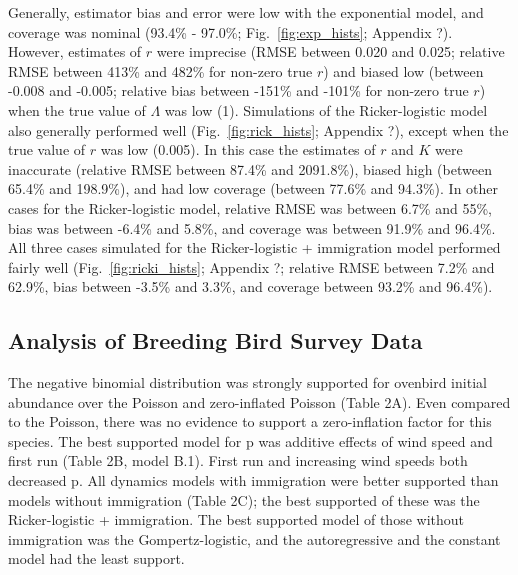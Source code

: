 \documentclass[12pt]{article}
\begin{document}
Generally, estimator bias and error were low with the exponential model, and 
coverage was nominal (93.4\% - 97.0\%; Fig.~\ref{fig:exp_hists}; Appendix ?). 
However, estimates of $r$ were 
imprecise (RMSE between 0.020 and 0.025; relative RMSE between 413\% and 
482\% for non-zero true $r$) and biased low (between -0.008 and -0.005; relative bias between
-151\% and -101\% for non-zero true $r$) when the true value of $\Lambda$ was low (1). 
Simulations of the Ricker-logistic model also generally performed well (Fig.~\ref{fig:rick_hists}; 
Appendix ?), except when the true value of $r$ was low (0.005). In this case the 
estimates of $r$ and $K$ were inaccurate (relative RMSE between 87.4\% and 2091.8\%),
biased high (between 65.4\% and 198.9\%), and had low coverage (between 77.6\% and 94.3\%).
In other cases for the Ricker-logistic model, relative RMSE was between 6.7\%
and 55\%, bias was between -6.4\% and 5.8\%, and coverage was between
91.9\% and 96.4\%.  All three cases simulated for the Ricker-logistic + immigration model 
performed fairly well (Fig.~\ref{fig:ricki_hists}; Appendix ?; relative RMSE between 7.2\% 
and 62.9\%, bias between -3.5\% and 3.3\%, and coverage between
93.2\% and 96.4\%).
  
\subsection{Analysis of Breeding Bird Survey Data}


The negative binomial distribution was strongly supported for ovenbird
initial abundance over the Poisson and zero-inflated Poisson
(Table 2A). Even compared to the Poisson, there was
no evidence to support a zero-inflation factor for this species.
The best supported model for p was additive effects of wind speed
and first run (Table 2B, model B.1). First run and increasing wind
speeds both decreased p. All dynamics models with immigration were
better supported than models without immigration (Table 2C); 
the best supported of these was the Ricker-logistic + immigration.
The best supported model of those without immigration was the
Gompertz-logistic, and the autoregressive and the constant model had the least
support.
\end{document}
